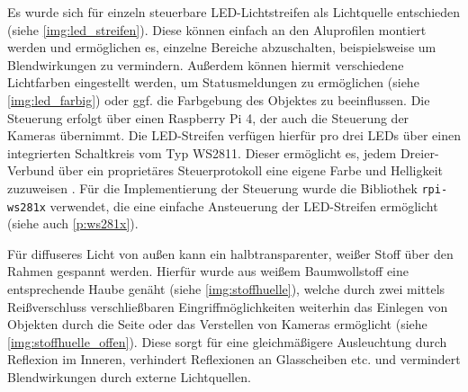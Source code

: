 \documentclass[./00PhotoBox.tex]{subfiles}
\begin{document}
Es wurde sich für einzeln steuerbare LED-Lichtstreifen als Lichtquelle entschieden (siehe \autoref{img:led_streifen}). Diese können einfach an den Aluprofilen montiert werden und ermöglichen es, einzelne Bereiche abzuschalten, beispielsweise um Blendwirkungen zu vermindern. Außerdem können hiermit verschiedene Lichtfarben eingestellt werden, um Statusmeldungen zu ermöglichen (siehe \autoref{img:led_farbig}) oder ggf. die Farbgebung des Objektes zu beeinflussen. Die Steuerung erfolgt über einen Raspberry Pi 4, der auch die Steuerung der Kameras übernimmt. Die LED-Streifen verfügen hierfür pro drei LEDs über einen integrierten Schaltkreis vom Typ WS2811. Dieser ermöglicht es, jedem Dreier-Verbund über ein proprietäres Steuerprotokoll eine eigene Farbe und Helligkeit zuzuweisen \citep[vgl.][]{ws2811}. Für die Implementierung der Steuerung wurde die Bibliothek \texttt{rpi-ws281x} verwendet, die eine einfache Ansteuerung der LED-Streifen ermöglicht (siehe auch \autoref{p:ws281x}).

Für diffuseres Licht von außen kann ein halbtransparenter, weißer Stoff über den Rahmen gespannt werden. Hierfür wurde aus weißem Baumwollstoff eine entsprechende Haube genäht (siehe \autoref{img:stoffhuelle}), welche durch zwei mittels Reißverschluss verschließbaren Eingriffmöglichkeiten weiterhin das Einlegen von Objekten durch die Seite oder das Verstellen von Kameras ermöglicht (siehe \autoref{img:stoffhuelle_offen}). Diese sorgt für eine gleichmäßigere Ausleuchtung durch Reflexion im Inneren, verhindert Reflexionen an Glasscheiben etc. und vermindert Blendwirkungen durch externe Lichtquellen.
\end{document}
